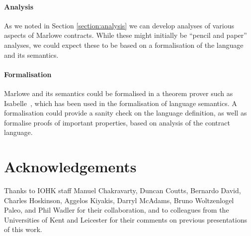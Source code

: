 \documentclass[
      acmsmall
    , screen
    , review=true
  ]{acmart}
\begin{document}
\paragraph{Analysis}

As we noted in Section \ref{section:analysis} we can develop analyses of various aspects of Marlowe contracts. While these might initially be ``pencil and paper'' analyses, we could expect these to be based on a formalisation of the language and its semantics.

\paragraph{Formalisation} 

Marlowe and its semantics could be formalised in a theorem prover such as Isabelle~\cite{IsabelleHOL}, which has been used in the formalisation of language semantics. A formalisation could provide a sanity check on the language definition, as well as formalise proofs of important properties, based on analysis of the contract language.


\section{Acknowledgements}


Thanks to IOHK staff Manuel Chakravarty, Duncan Coutts, Bernardo David, Charles Hoskinson, Aggelos Kiyakis, Darryl 
McAdams, Bruno Woltzenlogel Paleo, and Phil Wadler for their collaboration, and to colleagues from the Universities of 
Kent and Leicester for their comments on previous presentations of this work.






















\end{document}
